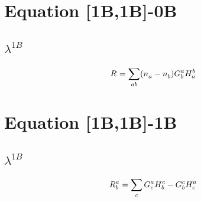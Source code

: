\documentclass{scrartcl}
\begin{document}
    
\section{Equation [1B,1B]-0B}
\subsection{$\lambda^{1B}$}
\begin{dmath*}
R^{}_{} = \sum_{ab} (n^{}_{a}-n^{}_{b}) \* G^{a}_{b} \* H^{b}_{a}
\end{dmath*}
\section{Equation [1B,1B]-1B}
\subsection{$\lambda^{1B}$}
\begin{dmath*}
R^{a}_{b} = \sum_{c} G^{a}_{c} \* H^{c}_{b}-G^{c}_{b} \* H^{a}_{c}
\end{dmath*}
\end{document}
